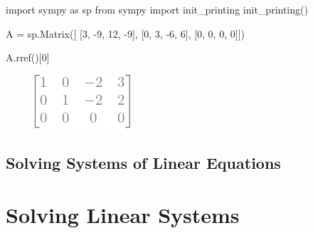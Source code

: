 \documentclass[
  letterpaper,
  DIV=11,
  numbers=noendperiod]{scrreprt}
\newenvironment{Shaded}{\begin{snugshade}}{\end{snugshade}}
\newcommand{\DecValTok}[1]{\textcolor[rgb]{0.68,0.00,0.00}{#1}}
\newcommand{\ImportTok}[1]{\textcolor[rgb]{0.00,0.46,0.62}{#1}}
\newcommand{\NormalTok}[1]{\textcolor[rgb]{0.00,0.23,0.31}{#1}}
\newcommand{\OperatorTok}[1]{\textcolor[rgb]{0.37,0.37,0.37}{#1}}
\begin{document}
\begin{Shaded}
\begin{Highlighting}[]
\ImportTok{import}\NormalTok{ sympy }\ImportTok{as}\NormalTok{ sp  }
\ImportTok{from}\NormalTok{ sympy }\ImportTok{import}\NormalTok{ init\_printing}
\NormalTok{init\_printing()}

\NormalTok{A }\OperatorTok{=}\NormalTok{ sp.Matrix([}
\NormalTok{    [}\DecValTok{3}\NormalTok{, }\OperatorTok{{-}}\DecValTok{9}\NormalTok{,  }\DecValTok{12}\NormalTok{,  }\OperatorTok{{-}}\DecValTok{9}\NormalTok{], }
\NormalTok{    [}\DecValTok{0}\NormalTok{,  }\DecValTok{3}\NormalTok{,  }\OperatorTok{{-}}\DecValTok{6}\NormalTok{,   }\DecValTok{6}\NormalTok{],}
\NormalTok{    [}\DecValTok{0}\NormalTok{,  }\DecValTok{0}\NormalTok{,   }\DecValTok{0}\NormalTok{,   }\DecValTok{0}\NormalTok{]])}

\NormalTok{A.rref()[}\DecValTok{0}\NormalTok{]}
\end{Highlighting}
\end{Shaded}

\begin{figure}[H]

{\centering \includegraphics{p2_files/figure-pdf/cell-4-output-1.png}

}

\end{figure}

\hypertarget{solving-systems-of-linear-equations}{%
\section*{Solving Systems of Linear
Equations}\label{solving-systems-of-linear-equations}}



\hypertarget{solving-linear-systems}{%
\chapter{Solving Linear Systems}\label{solving-linear-systems}}

\end{document}
